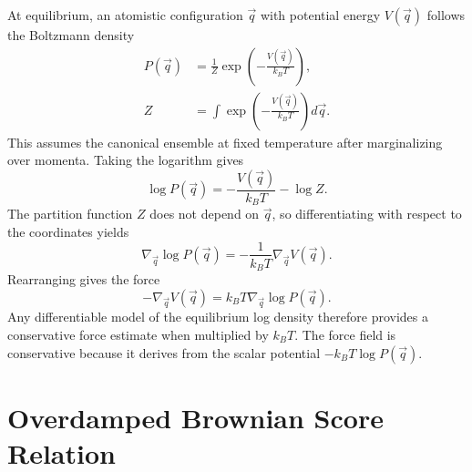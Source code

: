 \documentclass[reprint,amsmath,amssymb,aps,pra,10pt]{revtex4-2}
\begin{document}
At equilibrium, an atomistic configuration $\vec{q}$ with potential energy $V(\vec{q})$ follows the Boltzmann density
\begin{equation}
    \begin{aligned}
        P(\vec{q})
        &=
        \frac{1}{Z}
        \exp
        \left(
            -\frac{V(\vec{q})}{k_B T}
        \right),
        \\
        Z
        &=
        \int
        \exp
        \left(
            -\frac{V(\vec{q})}{k_B T}
        \right)
        d\vec{q}.
    \end{aligned}
\end{equation}
This assumes the canonical ensemble at fixed temperature after marginalizing over momenta.
Taking the logarithm gives
\begin{equation}
    \log P(\vec{q})
    =
    -\frac{V(\vec{q})}{k_B T}
    -
    \log Z.
\end{equation}
The partition function $Z$ does not depend on $\vec{q}$, so differentiating with respect to the coordinates yields
\begin{equation}
    \nabla_{\vec{q}}\log P(\vec{q})
    =
    -\frac{1}{k_B T}
    \nabla_{\vec{q}}V(\vec{q}).
\end{equation}
Rearranging gives the force
\begin{equation}
    -\nabla_{\vec{q}}V(\vec{q})
    =
    k_B T
    \nabla_{\vec{q}}\log P(\vec{q}).
\end{equation}
Any differentiable model of the equilibrium log density therefore provides a conservative force estimate when multiplied by $k_B T$.
The force field is conservative because it derives from the scalar potential $-k_B T\log P(\vec{q})$.

\section{Overdamped Brownian Score Relation}
\end{document}
